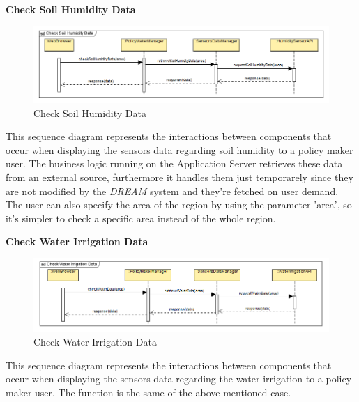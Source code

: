 \documentclass[table, 12pt]{article}
\begin{document}
\newpage
\textbf{Check Soil Humidity Data}
\begin{center}
    \begin{figure}[H]
        \includegraphics[scale=0.7, center]{assets/SequenceDiagram/CheckSoilHumidityData.png}
        \caption{Check Soil Humidity Data}
        \label{fig: humidity}
    \end{figure}
\end{center}
This sequence diagram represents the interactions between components that occur when displaying the sensors data regarding soil humidity to a policy maker user.
The business logic running on the Application Server retrieves these data from an external source, furthermore it handles them just temporarely since they are not modified by the \textit{DREAM} system and they're fetched on user demand.   
The user can also specify the area of the region by using the parameter 'area', so it's simpler to check a specific area instead of the whole region.

\newpage
\textbf{Check Water Irrigation Data} 
\begin{center}
    \begin{figure}[H]
        \includegraphics[scale=0.7, center]{assets/SequenceDiagram/CheckWaterIrrigationData.png}
        \caption{Check Water Irrigation Data}
        \label{fig: irrigation}
    \end{figure}
\end{center}
This sequence diagram represents the interactions between components that occur when displaying the sensors data regarding the water irrigation to a policy maker user.
The function is the same of the above mentioned case.
\end{document}
